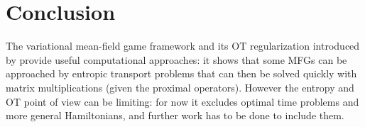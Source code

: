 \documentclass[11pt]{article}
\numberwithin{equation}{section}
\theoremstyle{definition}
\begin{document}
\section{Conclusion}

The variational mean-field game framework and its OT regularization introduced by \textcite{benamou:hal-01295299,benamou2018entropy} provide useful computational approaches: it shows that some MFGs can be approached by entropic transport problems that can then be solved quickly with matrix multiplications (given the proximal operators).
However the entropy and OT point of view can be limiting: for now it excludes optimal time problems and more general Hamiltonians, and further work has to be done to include them.




\printbibliography{}
\end{document}
